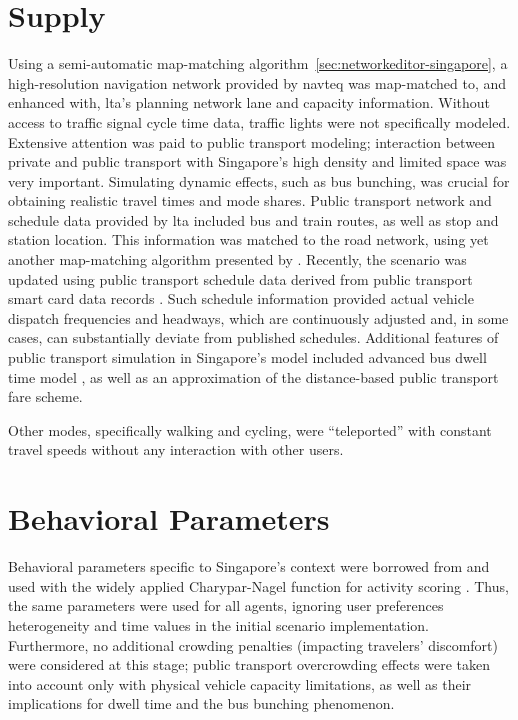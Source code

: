 \section{Supply}
Using a semi-automatic map-matching algorithm~\ref{sec:networkeditor-singapore}, a high-resolution navigation network provided by \gls{navteq} was map-matched to, and enhanced with, \gls{lta}'s planning network lane and capacity information. Without access to traffic signal cycle time data, traffic lights were not specifically modeled. Extensive attention was paid to public transport modeling; interaction between private and public transport with Singapore’s high density and limited space was very important. Simulating dynamic effects, such as bus bunching, was crucial for obtaining realistic travel times and mode shares. Public transport network and schedule data provided by \gls{lta} included bus and train routes, as well as stop and station location. This information was matched to the road network, using yet another map-matching algorithm presented by \citet[][]{Ordonez_HKSTS_2011, Ordonez_Webpage_2011_4}. Recently, the scenario was updated using public transport schedule data derived from public transport smart card data records \citet[][]{Fourie_TechRep_FCL_2014}. Such schedule information provided actual vehicle dispatch frequencies and headways, which are continuously adjusted and, in some cases, can substantially deviate from published schedules. Additional features of public transport simulation in Singapore’s model included advanced bus dwell time model \citep[][]{SunEtAl_TransResA_2014}, as well as an approximation of the distance-based public transport fare scheme.

Other modes, specifically walking and cycling, were ``teleported'' with constant travel speeds without any interaction with other users. 

\section{Behavioral Parameters}
Behavioral parameters specific to Singapore's context were borrowed from \citet[][]{LTA_unpub_2009} and used with the widely applied Charypar-Nagel function for activity scoring \citet[][]{CharyparNagel2005ga4acts}. Thus, the same parameters were used for all agents, ignoring user preferences heterogeneity and time values in the initial scenario implementation. Furthermore, no additional crowding penalties (impacting travelers' discomfort) were considered at this stage; public transport overcrowding effects were taken into account only with physical vehicle capacity limitations, as well as their implications for dwell time and the bus bunching phenomenon. 

